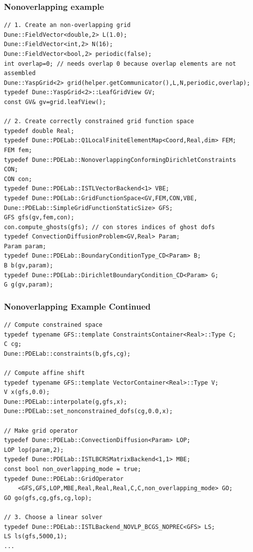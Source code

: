 \begin{frame}[fragile]
  \frametitle{Nonoverlapping example}
  \begin{lstlisting}[basicstyle=\tiny]
// 1. Create an non-overlapping grid
Dune::FieldVector<double,2> L(1.0);
Dune::FieldVector<int,2> N(16);
Dune::FieldVector<bool,2> periodic(false);
int overlap=0; // needs overlap 0 because overlap elements are not assembled
Dune::YaspGrid<2> grid(helper.getCommunicator(),L,N,periodic,overlap);
typedef Dune::YaspGrid<2>::LeafGridView GV;
const GV& gv=grid.leafView();

// 2. Create correctly constrained grid function space
typedef double Real;
typedef Dune::PDELab::Q1LocalFiniteElementMap<Coord,Real,dim> FEM;
FEM fem;
typedef Dune::PDELab::NonoverlappingConformingDirichletConstraints CON;
CON con;
typedef Dune::PDELab::ISTLVectorBackend<1> VBE;
typedef Dune::PDELab::GridFunctionSpace<GV,FEM,CON,VBE,
Dune::PDELab::SimpleGridFunctionStaticSize> GFS;
GFS gfs(gv,fem,con);
con.compute_ghosts(gfs); // con stores indices of ghost dofs
typedef ConvectionDiffusionProblem<GV,Real> Param;
Param param;
typedef Dune::PDELab::BoundaryConditionType_CD<Param> B;
B b(gv,param);
typedef Dune::PDELab::DirichletBoundaryCondition_CD<Param> G;
G g(gv,param);
\end{lstlisting}
\end{frame}
\begin{frame}[fragile]
\frametitle<presentation>{Nonoverlapping Example Continued}
  \begin{lstlisting}[basicstyle=\tiny]
// Compute constrained space
typedef typename GFS::template ConstraintsContainer<Real>::Type C;
C cg;
Dune::PDELab::constraints(b,gfs,cg);

// Compute affine shift
typedef typename GFS::template VectorContainer<Real>::Type V;
V x(gfs,0.0);
Dune::PDELab::interpolate(g,gfs,x);
Dune::PDELab::set_nonconstrained_dofs(cg,0.0,x);

// Make grid operator
typedef Dune::PDELab::ConvectionDiffusion<Param> LOP; 
LOP lop(param,2);
typedef Dune::PDELab::ISTLBCRSMatrixBackend<1,1> MBE;
const bool non_overlapping_mode = true;
typedef Dune::PDELab::GridOperator
    <GFS,GFS,LOP,MBE,Real,Real,Real,C,C,non_overlapping_mode> GO;
GO go(gfs,cg,gfs,cg,lop);

// 3. Choose a linear solver 
typedef Dune::PDELab::ISTLBackend_NOVLP_BCGS_NOPREC<GFS> LS;
LS ls(gfs,5000,1);
...
\end{lstlisting}
  
\end{frame}

